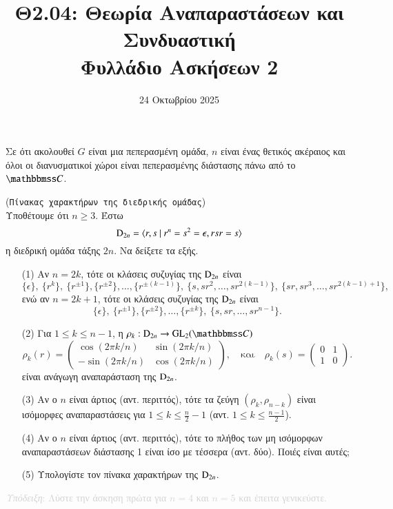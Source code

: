 \documentclass[12pt,a4paper,reqno]{amsart}
\title[]{Θ2.04: Θεωρία Αναπαραστάσεων και Συνδυαστική \\ Φυλλάδιο Ασκήσεων 2}
\date{24 Οκτωβρίου 2025}
\begin{document}
\begingroup
\def\uppercasenonmath#1{} %
\let\MakeUppercase\relax %
\maketitle
\endgroup

\setcounter{section}{2}
\thispagestyle{empty}

Σε ότι ακολουθεί $G$ είναι μια πεπερασμένη ομάδα, $n$ είναι ένας θετικός ακέραιος και όλοι οι διανυσματικοί χώροι είναι πεπερασμένης διάστασης πάνω από το $\CC$.

\begin{exercise}{(\texttt{Πίνακας χαρακτήρων της διεδρικής ομάδας})} \\
    Υποθέτουμε ότι $n\ge3$. Έστω 
    \[
    \mathrm{D}_{2n} = \langle r, s \ \vert \ r^n = s^2 = \epsilon, rsr=s \rangle
    \]
    η διεδρική ομάδα τάξης $2n$. Να δείξετε τα εξής.
    \begin{itemize}
        \item[(1)] Αν $n = 2k$, τότε οι κλάσεις συζυγίας της $\mathrm{D}_{2n}$ είναι 
        \[
        \{\epsilon\}, \
        \{r^k\}, \ 
        \{r^{\pm1}\}, \{r^{\pm2}\}, \dots, \{r^{\pm(k-1)}\}, \
        \{s, sr^2, \dots, sr^{2(k-1)}\}, \ 
        \{sr, sr^3, \dots, sr^{2(k-1)+1}\},
        \]
        ενώ αν $n = 2k+1$, τότε οι κλάσεις συζυγίας της $\mathrm{D}_{2n}$ είναι 
        \[
        \{\epsilon\}, \  
        \{r^{\pm1}\}, \{r^{\pm2}\}, \dots, \{r^{\pm k}\}, \ 
        \{s, sr, \dots, sr^{n-1}\}.
        \]
        \item[(2)] Για $1 \le k \le n-1$, η $\rho_k : \rmD_{2n} \to \GL_2(\CC)$ 
        \[
        \rho_k(r) = 
        \begin{pmatrix}
            \cos\left(2\pi{k}/n\right)  & \sin\left(2\pi{k}/n\right) \\
            -\sin\left(2\pi{k}/n\right) & \cos\left(2\pi{k}/n\right)
        \end{pmatrix},
        \quad 
        \text{και}
        \quad 
        \rho_k(s) = 
        \begin{pmatrix}
            0 & 1 \\
            1 & 0
        \end{pmatrix}.
        \]
        είναι ανάγωγη αναπαράσταση της $\mathrm{D}_{2n}$.
        \item[(3)] Αν ο $n$ είναι άρτιος (αντ. περιττός), τότε τα ζεύγη $(\rho_k,\rho_{n-k})$ είναι ισόμορφες αναπαραστάσεις για $1 \le k \le \frac{n}{2}-1$ (αντ. $1 \le k \le \frac{n-1}{2}$). 
        \item[(4)] Αν ο $n$ είναι άρτιος (αντ. περιττός), τότε το πλήθος των μη ισόμορφων αναπαρα\-στάσεων διάστασης 1 είναι ίσο με τέσσερα (αντ. δύο). Ποιές είναι αυτές;
        \item[(5)] Υπολογίστε τον πίνακα χαρακτήρων της $\mathrm{D}_{2n}$.
    \end{itemize}

    \textcolor{lightgray}{\small{\emph{Υπόδειξη}: Λύστε την άσκηση πρώτα για $n=4$ και $n=5$ και έπειτα γενικεύστε.}} 
\end{exercise}
\end{document}
